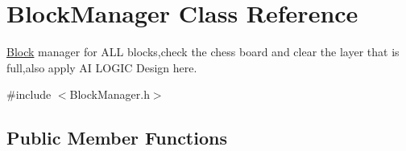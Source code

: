 \hypertarget{class_block_manager}{\section{Block\-Manager Class Reference}
\label{class_block_manager}
}


\hyperlink{class_block}{Block} manager for A\-L\-L blocks,check the chess board and clear the layer that is full,also apply A\-I L\-O\-G\-I\-C Design here.  




{\ttfamily \#include $<$Block\-Manager.\-h$>$}

\subsection*{Public Member Functions}
